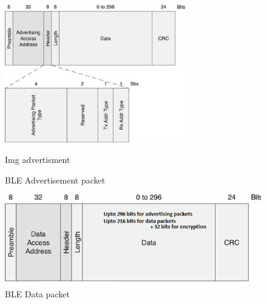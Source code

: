 \documentclass[]{article}
\begin{document}
\begin{figure}[!h]
	\centering
	\includegraphics[width = 0.7\textwidth]{advertisement}
	\caption{\ac{BLE} Advertisement packet}
	\label{fig:advertisement}
	{Img advertisment}
\end{figure}

\begin{figure}[!h]
	\begin{center}
		\includegraphics[width = 1\textwidth]{data}
	\end{center}
	\caption{\ac{BLE} Data packet}
	\label{fig:data}
\end{figure}
\end{document}
